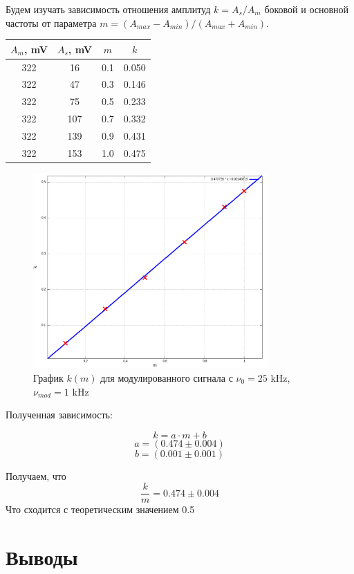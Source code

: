 \documentclass{article}
\begin{document}
Будем изучать зависимость отношения амплитуд \( k = A_s/A_m \) боковой и основной частоты от 
параметра \(m = \left(A_{max} - A_{min}\right) / \left(A_{max} + A_{min}\right)\).


\begin{table}[H]
    \centering
    \begin{tabular}{|c|c|c|c|}
        \hline
        \(A_{m}\), mV &  \(A_{s}\), mV & \(m\) & \(k\) \\\hline
        322 & 16  & 0.1 & 0.050 \\\hline
        322 & 47  & 0.3 & 0.146 \\\hline
        322 & 75  & 0.5 & 0.233 \\\hline
        322 & 107 & 0.7 & 0.332 \\\hline
        322 & 139 & 0.9 & 0.431 \\\hline
        322 & 153 & 1.0 & 0.475 \\\hline
        \end{tabular}
\end{table}

\begin{figure}[H]
    \centering
    \includegraphics[width=0.8\textwidth]{mod.png}
    \caption{График \( k(m) \) для модулированного сигнала с \(\nu_0 = 25\) kHz, \(\nu_{mod} = 1\) kHz}
    \label{pic_dnu_tau}
\end{figure}

Полученная зависимость:

\[ k = a\cdot m + b \]
\[ a = (0.474 \pm 0.004) \]
\[ b = (0.001 \pm 0.001)\]

Получаем, что 
\[ \frac{k}{m} = 0.474 \pm 0.004 \]
Что сходится с теоретическим значением 0.5

\section{Выводы}
\end{document}
